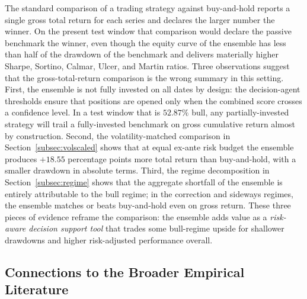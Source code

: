 \documentclass{ieeeaccess}
\newcommand{\VolScaledExcessPP}{\ensuremath{+18.55}}
\newcommand{\RegBullShare}{52.87\%}
\begin{document}
The standard comparison of a trading strategy against buy-and-hold reports a single gross total return for each series and declares the larger number the winner. On the present test window that comparison would declare the passive benchmark the winner, even though the equity curve of the ensemble has less than half of the drawdown of the benchmark and delivers materially higher Sharpe, Sortino, Calmar, Ulcer, and Martin ratios. Three observations suggest that the gross-total-return comparison is the wrong summary in this setting. First, the ensemble is not fully invested on all dates by design: the decision-agent thresholds ensure that positions are opened only when the combined score crosses a confidence level. In a test window that is $\RegBullShare{}$ bull, any partially-invested strategy will trail a fully-invested benchmark on gross cumulative return almost by construction. Second, the volatility-matched comparison in Section~\ref{subsec:volscaled} shows that at equal ex-ante risk budget the ensemble produces $\VolScaledExcessPP{}$ percentage points more total return than buy-and-hold, with a smaller drawdown in absolute terms. Third, the regime decomposition in Section~\ref{subsec:regime} shows that the aggregate shortfall of the ensemble is entirely attributable to the bull regime; in the correction and sideways regimes, the ensemble matches or beats buy-and-hold even on gross return. These three pieces of evidence reframe the comparison: the ensemble adds value as a \emph{risk-aware decision support tool} that trades some bull-regime upside for shallower drawdowns and higher risk-adjusted performance overall.

\subsection{Connections to the Broader Empirical Literature}
\end{document}
